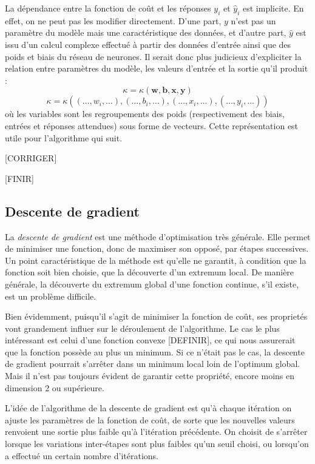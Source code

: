 La dépendance entre la fonction de coût et les réponses \(y_i\) et \(\hat{y}_i\) est implicite. En effet, on ne peut pas les modifier directement. D'une part, $y$ n'est pas un paramètre du modèle mais une caractéristique des données, et d'autre part, $\hat{y}$ est issu d'un calcul complexe effectué à partir des données d'entrée ainsi que des poids et biais du réseau de neurones. Il serait donc plus judicieux d'expliciter la relation entre paramètres du modèle, les valeurs d'entrée et la sortie qu'il produit : 
\[ \kappa = \kappa(\boldsymbol{w}, \boldsymbol{b}, \boldsymbol{x}, \boldsymbol{y})\]
\[ \kappa = \kappa((\dotsc, w_i, \dotsc), (\dotsc, b_i, \dotsc), (\dotsc, x_i, \dotsc), (\dotsc, y_i, \dotsc))\]
où les variables sont les regroupements des poids (respectivement des biais, entrées et réponses attendues) sous forme de vecteurs.
Cette représentation est utile pour l'algorithme qui suit.

[CORRIGER]

[FINIR]

\subsection{Descente de gradient}\label{subseq:desc_grad}
La \emph{descente de gradient} est une méthode d'optimisation très générale. Elle permet de minimiser une fonction, donc de maximiser son opposé, par étapes successives. Un point caractéristique de la méthode est qu'elle ne garantit, à condition que la fonction soit bien choisie, que la découverte d'un extremum local. De manière générale, la découverte du extremum global d'une fonction continue, s'il existe, est un problème difficile.

Bien évidemment, puisqu'il s'agit de minimiser la fonction de coût, ses proprietés vont grandement influer sur le déroulement de l'algorithme. Le cas le plus intéressant est celui d'une fonction convexe [DEFINIR], ce qui nous assurerait que la fonction possède au plus un minimum. Si ce n'était pas le cas, la descente de gradient pourrait s'arrêter dans un minimum local loin de l'optimum global. Mais il n'est pas toujours évident de garantir cette propriété, encore moins en dimension 2 ou supérieure.

L'idée de l'algorithme de la descente de gradient est qu'à chaque itération on ajuste les paramètres de la fonction de coût, de sorte que les nouvelles valeurs renvoient une sortie plus faible qu'à l'itération précédente. On choisit de s'arrêter lorsque les variations inter-étapes sont plus faibles qu'un seuil choisi, ou lorsqu'on a effectué un certain nombre d'itérations. 

